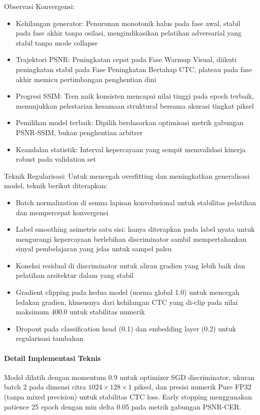 \documentclass[journal]{IEEEtran}
\begin{document}
Observasi Konvergensi:
\begin{itemize}
    \item Kehilangan generator: Penurunan monotonik halus pada fase awal, stabil pada fase akhir tanpa osilasi, mengindikasikan pelatihan adversarial yang stabil tanpa mode collapse
    \item Trajektori PSNR: Peningkatan cepat pada Fase Warmup Visual, diikuti peningkatan stabil pada Fase Peningkatan Bertahap CTC, plateau pada fase akhir memicu pertimbangan penghentian dini
    \item Progresi SSIM: Tren naik konsisten mencapai nilai tinggi pada epoch terbaik, menunjukkan pelestarian kesamaan struktural bersama akurasi tingkat piksel
    \item Pemilihan model terbaik: Dipilih berdasarkan optimisasi metrik gabungan PSNR-SSIM, bukan penghentian arbitrer
    \item Keandalan statistik: Interval kepercayaan yang sempit memvalidasi kinerja robust pada validation set
\end{itemize}

Teknik Regularisasi: Untuk mencegah overfitting dan meningkatkan generalisasi model, teknik berikut diterapkan:

\begin{itemize}
    \item Batch normalization di semua lapisan konvolusional untuk stabilitas pelatihan dan mempercepat konvergensi
    \item Label smoothing asimetris satu sisi: hanya diterapkan pada label nyata untuk mengurangi kepercayaan berlebihan discriminator sambil mempertahankan sinyal pembelajaran yang jelas untuk sampel palsu
    \item Koneksi residual di discriminator untuk aliran gradien yang lebih baik dan pelatihan arsitektur dalam yang stabil
    \item Gradient clipping pada kedua model (norma global 1.0) untuk mencegah ledakan gradien, khususnya dari kehilangan CTC yang di-clip pada nilai maksimum 400.0 untuk stabilitas numerik
    \item Dropout pada classification head (0.1) dan embedding layer (0.2) untuk regularisasi tambahan
\end{itemize}

\paragraph{Detail Implementasi Teknis} Model dilatih dengan momentum 0.9 untuk optimizer SGD discriminator, ukuran batch 2 pada dimensi citra $1024 \times 128 \times 1$ piksel, dan presisi numerik Pure FP32 (tanpa mixed precision) untuk stabilitas CTC loss. Early stopping menggunakan patience 25 epoch dengan min delta 0.05 pada metrik gabungan PSNR-CER.
\end{document}
